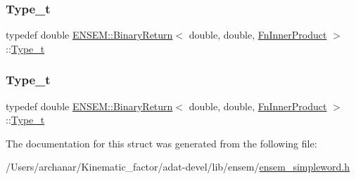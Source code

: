 \mbox{\label{structENSEM_1_1BinaryReturn_3_01double_00_01double_00_01FnInnerProduct_01_4_ad70792f5fdfdd15bfa202a4282cb068b}} 
\subsubsection{\texorpdfstring{Type\_t}{Type\_t}\hspace{0.1cm}{\footnotesize\ttfamily [2/3]}}
{\footnotesize\ttfamily typedef double \mbox{\hyperlink{structENSEM_1_1BinaryReturn}{E\+N\+S\+E\+M\+::\+Binary\+Return}}$<$ double, double, \mbox{\hyperlink{structENSEM_1_1FnInnerProduct}{Fn\+Inner\+Product}} $>$\+::\mbox{\hyperlink{structENSEM_1_1BinaryReturn_3_01double_00_01double_00_01FnInnerProduct_01_4_ad70792f5fdfdd15bfa202a4282cb068b}{Type\+\_\+t}}}

\mbox{\label{structENSEM_1_1BinaryReturn_3_01double_00_01double_00_01FnInnerProduct_01_4_ad70792f5fdfdd15bfa202a4282cb068b}} 
\subsubsection{\texorpdfstring{Type\_t}{Type\_t}\hspace{0.1cm}{\footnotesize\ttfamily [3/3]}}
{\footnotesize\ttfamily typedef double \mbox{\hyperlink{structENSEM_1_1BinaryReturn}{E\+N\+S\+E\+M\+::\+Binary\+Return}}$<$ double, double, \mbox{\hyperlink{structENSEM_1_1FnInnerProduct}{Fn\+Inner\+Product}} $>$\+::\mbox{\hyperlink{structENSEM_1_1BinaryReturn_3_01double_00_01double_00_01FnInnerProduct_01_4_ad70792f5fdfdd15bfa202a4282cb068b}{Type\+\_\+t}}}



The documentation for this struct was generated from the following file\+:\begin{DoxyCompactItemize}
\item 
/\+Users/archanar/\+Kinematic\+\_\+factor/adat-\/devel/lib/ensem/\mbox{\hyperlink{adat-devel_2lib_2ensem_2ensem__simpleword_8h}{ensem\+\_\+simpleword.\+h}}\end{DoxyCompactItemize}
